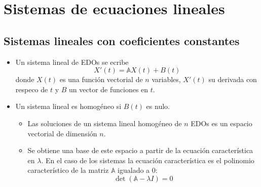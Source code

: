 \hypertarget{sistemas-de-ecuaciones-lineales}{%
\section{Sistemas de ecuaciones
lineales}\label{sistemas-de-ecuaciones-lineales}}

\hypertarget{sistemas-lineales-con-coeficientes-constantes}{%
\subsection{Sistemas lineales con coeficientes
constantes}\label{sistemas-lineales-con-coeficientes-constantes}}

\begin{itemize}
\item
  Un sistema lineal de EDOs se ecribe \[X'(t) = \mathbb{A}X(t) + B(t)\]
  donde \(X(t)\) es una función vectorial de \(n\) variables, \(X'(t)\)
  su derivada con respeco de \(t\) y \(B\) un vector de funciones en
  \(t\).
\item
  Un sistema lineal es homogéneo si \(B(t)\) es nulo.

  \begin{itemize}
  \item
    Las soluciones de un sistema lineal homogéneo de \(n\) EDOs es un
    espacio vectorial de dimensión \(n\).
  \item
    Se obtiene una base de este espacio a partir de la ecuación
    característica en \(\lambda\). En el caso de los sistemas la
    ecuación característica es el polinomio característico de la matriz
    \(\mathbb{A}\) igualado a 0: \[\det (\mathbb{A}- \lambda I) = 0\]


\end{itemize}
\end{itemize}
